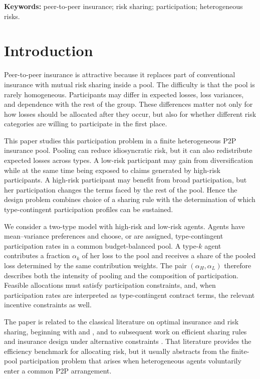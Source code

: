 \documentclass[a4paper,12pt]{article}
\theoremstyle{definition}
\theoremstyle{remark}
\newcommand{\1}{\mathbf{1}}
\begin{document}
\noindent\textbf{Keywords:} peer-to-peer insurance; risk sharing; participation; heterogeneous risks.\\


\section{Introduction}

Peer-to-peer insurance is attractive because it replaces part of conventional insurance with mutual risk sharing inside a pool. The difficulty is that the pool is rarely homogeneous. Participants may differ in expected losses, loss variances, and dependence with the rest of the group. These differences matter not only for how losses should be allocated after they occur, but also for whether different risk categories are willing to participate in the first place.

This paper studies this participation problem in a finite heterogeneous P2P insurance pool. Pooling can reduce idiosyncratic risk, but it can also redistribute expected losses across types. A low-risk participant may gain from diversification while at the same time being exposed to claims generated by high-risk participants. A high-risk participant may benefit from broad participation, but her participation changes the terms faced by the rest of the pool. Hence the design problem combines choice of a sharing rule with the determination of which type-contingent participation profiles can be sustained.

We consider a two-type model with high-risk and low-risk agents. Agents have mean--variance preferences and choose, or are assigned, type-contingent participation rates in a common budget-balanced pool. A type-\(k\) agent contributes a fraction \(\alpha_k\) of her loss to the pool and receives a share of the pooled loss determined by the same contribution weights. The pair \((\alpha_H,\alpha_L)\) therefore describes both the intensity of pooling and the composition of participation. Feasible allocations must satisfy participation constraints, and, when participation rates are interpreted as type-contingent contract terms, the relevant incentive constraints as well.

The paper is related to the classical literature on optimal insurance and risk sharing, beginning with \citet{Borch1962} and \citet{Arrow1974}, and to subsequent work on efficient sharing rules and insurance design under alternative constraints \citep{Raviv1979,CumminsMahul2004,DanaScarsini2007,JouiniSchachermayerTouzi2008}. That literature provides the efficiency benchmark for allocating risk, but it usually abstracts from the finite-pool participation problem that arises when heterogeneous agents voluntarily enter a common P2P arrangement.
\end{document}
